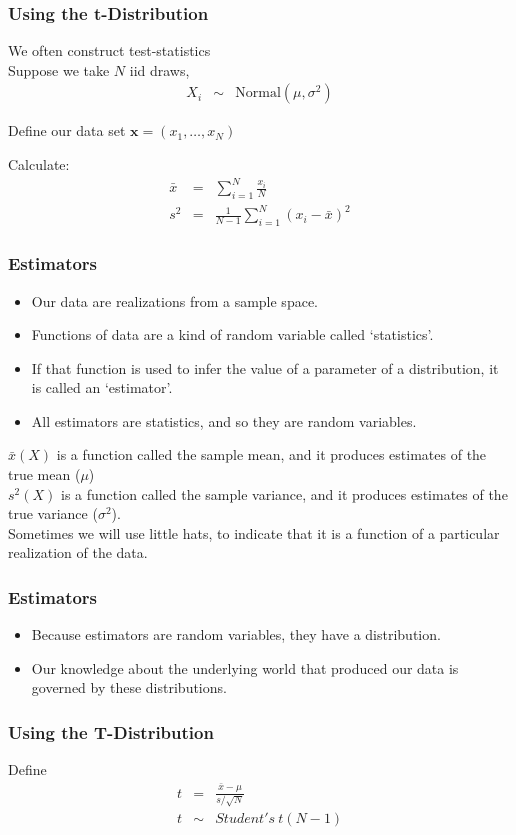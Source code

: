 \documentclass[handout]{beamer}
\numberwithin{equation}{section}
\begin{document}
\begin{frame}
\frametitle{Using the t-Distribution}

We often construct \alert{test-statistics}\\
Suppose we take $N$ iid draws, 
\begin{eqnarray}
X_{i} & \sim & \text{Normal}(\mu, \sigma^2) \nonumber 
\end{eqnarray}

Define our data set $\boldsymbol{x} = (x_{1}, \hdots, x_{N})$

Calculate:
\begin{eqnarray}
 \bar{x} & = &  \sum_{i=1}^{N} \frac{x_{i}}{N} \nonumber \\
 s^2 & = & \frac{1}{N-1} \sum_{i=1}^{N} (x_{i} - \bar{x})^2 \nonumber 
\end{eqnarray}

\end{frame}

\begin{frame}
\frametitle{Estimators}
\begin{itemize}
\item Our data are realizations from a sample space.\pause
\item Functions of data are a kind of random variable called `statistics'. \pause  
\item If that function is used to infer the value of a parameter of a distribution, it is called an `estimator'.\pause
\item All estimators are statistics, and so they are random variables.\pause
\end{itemize}
$\bar{x}(X)$ is a function called the sample mean, and it produces estimates of the true mean ($\mu$)\\ \pause
$s^2(X)$ is a function called the sample variance, and it produces estimates of the true variance ($\sigma^2$).\\ \pause
Sometimes we will use little hats, to indicate that it is a function of a particular realization of the data.

\end{frame}
\begin{frame}
\frametitle{Estimators}
\begin{itemize}
\item Because estimators are random variables, they have a distribution.\pause
\item Our knowledge about the underlying world that produced our data is governed by these distributions.
\end{itemize}
\end{frame}

\begin{frame}
\frametitle{Using the T-Distribution}

Define 
\begin{eqnarray}
t & = & \frac{\bar{x} - \mu}{s/\sqrt{N}} \nonumber \\
t & \sim &Student's\ t(N-1) \nonumber 
\end{eqnarray}


\end{frame}
\end{document}
